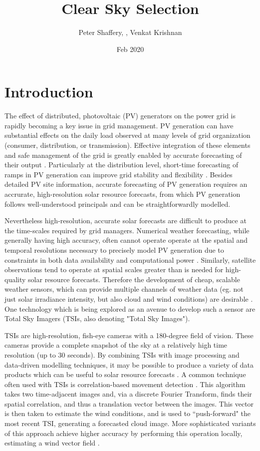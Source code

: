 \documentclass{article}
\title{Clear Sky Selection}
\author{Peter Shaffery, \rojo{Aron Habte, SRRL, Marcos Netto}, Venkat Krishnan}
\date{Feb 2020}
\begin{document}
\maketitle
\section{Introduction}
The effect of distributed, photovoltaic (PV) generators on the power grid is rapidly becoming a key issue in grid management. PV generation can have substantial effects on the daily load observed at many levels of grid organization (consumer, distribution, or transmission). Effective integration of these elements and safe management of the grid is greatly enabled by accurate forecasting of their output \citep{m_coddinton_grid-integrated_2016,noauthor_visibility_2017}. Particularly at the distribution level, short-time forecasting of ramps in PV generation can improve grid stability and flexibility \citep{noauthor_coordination_2017}. Besides detailed PV site information, accurate forecasting of PV generation requires an accrurate, high-resolution solar resource forecasts, from which PV generation follows well-understood principals and can be straightforwardly modelled.

Nevertheless high-resolution, accurate solar forecasts are difficult to produce at the time-scales required by grid managers. Numerical weather forecasting, while generally having high accuracy, often cannot operate operate at the spatial and temporal resolutions necessary to precisely model PV generation due to constraints in both data availability and computational power \citep{diagne_review_2013,sengupta_best_2015}. Similarly, satellite observations tend to operate at spatial scales greater than is needed for high-quality solar resource forecasts. Therefore the development of cheap, scalable weather sensors, which can provide multiple channels of weather data (eg. not just solar irradiance intensity, but also cloud and wind conditions) are desirable \citep{summers_sensing_nodate}. One technology which is being explored as an avenue to develop such a sensor are Total Sky Imagers (TSIs, also denoting "Total Sky Images").

TSIs are high-resolution, fish-eye cameras with a 180-degree field of vision. These cameras provide a complete snapshot of the sky at a relatively high time resolution (up to 30 seconds). By combining TSIs with image processing and data-driven modelling techniques, it may be possible to produce a variety of data products which can be useful to solar resource forecasts \citep{chow_intra-hour_2011,ghonima_method_2012}. A common technique often used with TSIs is correlation-based movement detection \citep{huang_correlation_nodate}. This algorithm takes two time-adjacent images and, via a discrete Fourier Transform, finds their spatial correlation, and thus a translation vector between the images. This vector is then taken to estimate the wind conditions, and is used to ``push-forward" the most recent TSI, generating a forecasted cloud image. More sophisticated variants of this approach achieve higher accuracy by performing this operation locally, estimating a wind vector field \citep{hamill_short-term_1993,marquez_intra-hour_2013,magnone_cloud_2017}.
\end{document}
